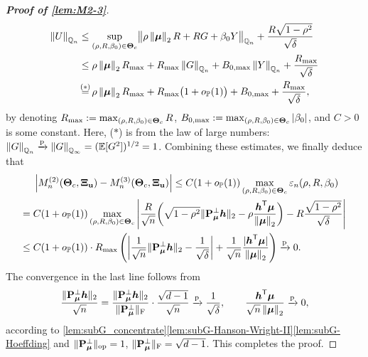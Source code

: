 \begin{proof}[\textbf{Proof of \cref{lem:M2-3}}]
    \begin{align*}
        \norm{U}_{\Q_n} & \le  \sup_{(\rho, R, \beta_0) \in \bTheta_{c}} \bigl\| \rho\norm{\vmu}_2 R + R G + \beta_0 Y \bigr\|_{\Q_n}
        + \frac{R \sqrt{1 - \rho^2}}{\sqrt{\delta}} 
        \\
        & \le \rho\norm{\vmu}_2 R_{\max} + R_{\max} \norm{G}_{\Q_n} + B_{0, \max} \norm{Y}_{\Q_n} + \frac{R_{\max}}{\sqrt{\delta}} \\
        & \overset{\mathmakebox[0pt][c]{\smash{\text{($*$)}}}}{=} 
        \rho\norm{\vmu}_2 R_{\max} + R_{\max} \bigl( 1 + o_{\P}(1) \bigr) + B_{0, \max} + \frac{R_{\max}}{\sqrt{\delta}},
    \end{align*}
    by denoting $R_{\max} := \max_{(\rho, R, \beta_0) \in \text{\boldmath $\Theta$}_{c}} R$, $B_{0, \max} := \max_{(\rho, R, \beta_0) \in \text{\boldmath $\Theta$}_{c}} \left|{\beta_0}\right|$, and $C > 0$ is some constant. Here, ($*$) is from the law of large numbers: $\left\|{G}\right\|_{\mathbb{Q}_n} \xrightarrow{\mathrm{p}} \left\|{G}\right\|_{\mathbb{Q}_\infty} = (\mathbb{E}[G^2])^{1/2} = 1$. Combining these estimates, we finally deduce that
    \begin{align*}
        & \left|{M_n^{(2)}(\text{\boldmath $\Theta$}_{c}, \text{\boldmath $\Xi$}_{\mathrm{\bf u}}) - M_n^{(3)}(\text{\boldmath $\Theta$}_{c}, \text{\boldmath $\Xi$}_{\mathrm{\bf u}})}\right| 
        \le  C ( 1 + o_{\mathbb{P}}(1) ) \max_{(\rho, R, \beta_0) \in \text{\boldmath $\Theta$}_{c}} \varepsilon_n (\rho, R, \beta_0) \\
        = {} & 
        C ( 1 + o_{\mathbb{P}}(1) ) \max_{(\rho, R, \beta_0) \in \text{\boldmath $\Theta$}_{c}} \left\vert \frac{R}{\sqrt{n}} \biggl( \sqrt{1 - \rho^2}  \| \mathrm{\bf P}_{\text{\boldmath $\mu$}}^\perp \text{\boldmath $h$} \|_2  -  \rho\frac{\text{\boldmath $h$}^{\sf T} {\boldsymbol{\mu}}}{\left\|{{\boldsymbol{\mu}}}\right\|_2}  \biggr) - R \frac{\sqrt{1 - \rho^2}}{\sqrt{\delta}} \right\vert \\
        \le {} & 
        C ( 1 + o_{\mathbb{P}}(1) ) \cdot R_{\max} \left( \left\vert \frac{1}{\sqrt{n}} \| \mathrm{\bf P}_{\text{\boldmath $\mu$}}^\perp \text{\boldmath $h$} \|_2 - \frac{1}{\sqrt{\delta}} \right\vert + \frac{1}{\sqrt{n}} \frac{\vert \text{\boldmath $h$}^{\sf T} {\boldsymbol{\mu}} \vert}{\left\|{{\boldsymbol{\mu}}}\right\|_2} \right) \xrightarrow{\mathrm{p}} 0.
    \end{align*}
    The convergence in the last line follows from
\begin{equation*}
    \frac{\| \mathrm{\bf P}_{\text{\boldmath $\mu$}}^\perp \text{\boldmath $h$} \|_2}{\sqrt{n}} = \frac{\| \mathrm{\bf P}_{\text{\boldmath $\mu$}}^\perp \text{\boldmath $h$} \|_2}{\| \mathrm{\bf P}_{\text{\boldmath $\mu$}}^\perp \|_\mathrm{F}}
    \cdot \frac{\sqrt{d-1}}{\sqrt{n}}
    \xrightarrow{\mathrm{p}} \frac{1}{\sqrt{\delta}},
    \qquad
    \frac{ \text{\boldmath $h$}^{\sf T} {\boldsymbol{\mu}} }{ \sqrt{n} \left\|{{\boldsymbol{\mu}}}\right\|_2 } \xrightarrow{\mathrm{p}} 0,
\end{equation*}
according to \cref{lem:subG_concentrate}\ref{lem:subG-Hanson-Wright-II}\ref{lem:subG-Hoeffding} and $\|\mathrm{\bf P}_{\text{\boldmath $\mu$}}^\perp \|_\mathrm{op} = 1$, $\| \mathrm{\bf P}_{\text{\boldmath $\mu$}}^\perp \|_\mathrm{F} = \sqrt{d - 1}$. This completes the proof.
\end{proof}



